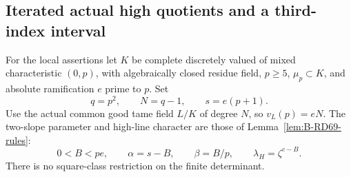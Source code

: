 \subsection{Iterated actual high quotients and a third-index interval}

For the local assertions let \(K\) be complete discretely valued
of mixed characteristic \((0,p)\), with algebraically closed
residue field, \(p\ge5\), \(\mu_p\subset K\), and absolute
ramification \(e\) prime to \(p\). Set
\[
 q=p^2,\qquad N=q-1,\qquad s=e(p+1).
 \tag{B-RD74.1}
\]
Use the actual common good tame field \(L/K\) of degree \(N\),
so \(v_L(p)=eN\). The two-slope parameter and high-line
character are those of Lemma~\ref{lem:B-RD69-rules}:
\[
 0<B<pe,\qquad \alpha=s-B,\qquad\beta=B/p,
 \qquad \lambda_H=\zeta^{c-B}.
 \tag{B-RD74.2}
\]
There is no square-class restriction on the finite determinant.

